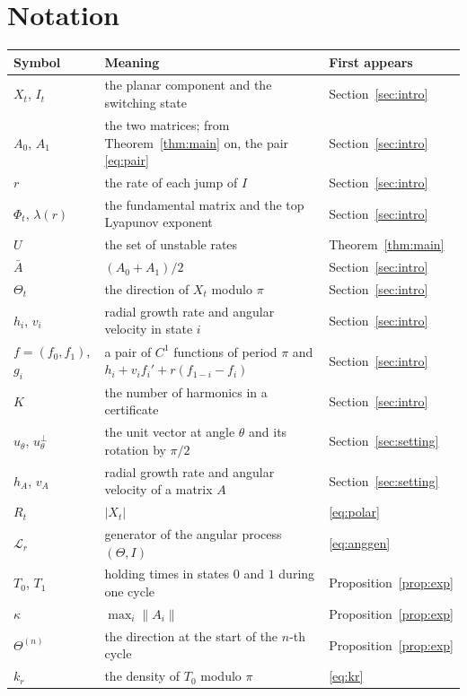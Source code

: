 \documentclass[11pt]{amsart}
\newcommand{\cL}{\mathcal{L}}
\begin{document}
\section{Notation}\label{app:notation}
\begin{center}
\small
\begin{tabular}{@{}lp{}l@{}}
\toprule
Symbol & Meaning & First appears\\
\midrule
$X_t$, $I_t$ & the planar component and the switching state & Section~\ref{sec:intro}\\
$A_0$, $A_1$ & the two matrices; from Theorem~\ref{thm:main} on, the pair \eqref{eq:pair} & Section~\ref{sec:intro}\\
$r$ & the rate of each jump of $I$ & Section~\ref{sec:intro}\\
$\Phi_t$, $\lambda(r)$ & the fundamental matrix and the top Lyapunov exponent & Section~\ref{sec:intro}\\
$U$ & the set of unstable rates & Theorem~\ref{thm:main}\\
$\bar A$ & $(A_0+A_1)/2$ & Section~\ref{sec:intro}\\
$\Theta_t$ & the direction of $X_t$ modulo $\pi$ & Section~\ref{sec:intro}\\
$h_i$, $v_i$ & radial growth rate and angular velocity in state $i$ & Section~\ref{sec:intro}\\
$f=(f_0,f_1)$, $g_i$ & a pair of $C^1$ functions of period $\pi$ and $h_i+v_if_i'+r(f_{1-i}-f_i)$ & Section~\ref{sec:intro}\\
$K$ & the number of harmonics in a certificate & Section~\ref{sec:intro}\\
$u_\theta$, $u_\theta^\perp$ & the unit vector at angle $\theta$ and its rotation by $\pi/2$ & Section~\ref{sec:setting}\\
$h_A$, $v_A$ & radial growth rate and angular velocity of a matrix $A$ & Section~\ref{sec:setting}\\
$R_t$ & $|X_t|$ & \eqref{eq:polar}\\
$\cL_r$ & generator of the angular process $(\Theta,I)$ & \eqref{eq:anggen}\\
$T_0$, $T_1$ & holding times in states $0$ and $1$ during one cycle & Proposition~\ref{prop:exp}\\
$\kappa$ & $\max_i\|A_i\|$ & Proposition~\ref{prop:exp}\\
$\Theta^{(n)}$ & the direction at the start of the $n$-th cycle & Proposition~\ref{prop:exp}\\
$k_r$ & the density of $T_0$ modulo $\pi$ & \eqref{eq:kr}\\

\end{tabular}
\end{center}
\end{document}
